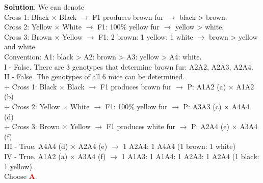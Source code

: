\documentclass{article}
\begin{document}
{\begin{mdframed}[linewidth=1pt,linecolor=red]
		\textbf{Solution}: We can denote \\
		Cross 1: Black $\times$ Black $\rightarrow$ F1 produces brown fur $\rightarrow$ black > brown. \\
		Cross 2: Yellow $\times$ White $\rightarrow$ F1: 100$\%$ yellow fur $\rightarrow$ yellow > white.\\
		Cross 3: Brown $\times$ Yellow $\rightarrow$ F1: 2 brown: 1 yellow: 1 white $\rightarrow$ brown > yellow and white. \\
		Convention: A1: black > A2: brown > A3: yellow > A4: white. \\
		I - False. There are 3 genotypes that determine brown fur: A2A2, A2A3, A2A4.\\
		II - False. The genotypes of all 6 mice can be determined.\\
		+ Cross 1: Black $\times$ Black $\rightarrow$ F1 produces brown fur $\rightarrow$ P: A1A2 (a) $\times$ A1A2 (b) \\
		+ Cross 2: Yellow $\times$ White $\rightarrow$ F1: 100$\%$ yellow fur $\rightarrow$ P: A3A3 (c) $\times$ A4A4 (d) \\
		+ Cross 3: Brown $\times$ Yellow $\rightarrow$ F1 produces white fur $\rightarrow$ P: A2A4 (e) $\times$ A3A4 (f) \\
		III - True. A4A4 (d) $\times$ A2A4 (e) $\rightarrow$ 1 A2A4: 1 A4A4 (1 brown: 1 white) \\
		IV - True. A1A2 (a) $\times$ A3A4 (f) $\rightarrow$ 1 A1A3: 1 A1A4: 1 A2A3: 1 A2A4 (1 black: 1 yellow). \\
		Choose \textcolor{red}{\textbf{A}}.
		

\end{mdframed}}
\end{document}

